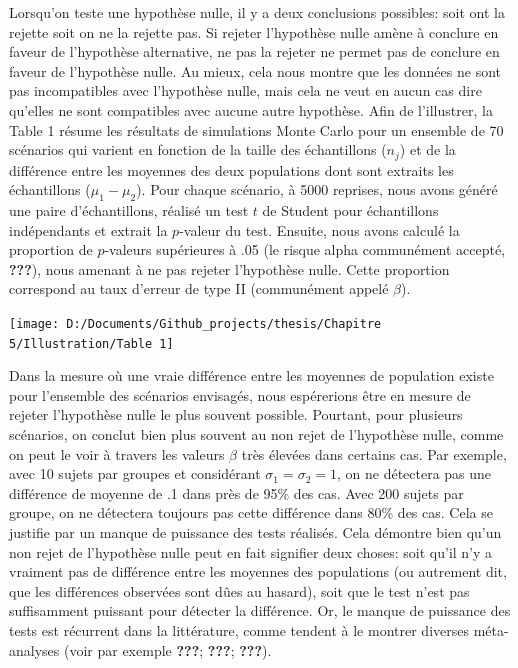 \documentclass[
  english,
  man]{apa6}
\begin{document}
Lorsqu'on teste une hypothèse nulle, il y a deux conclusions possibles: soit ont la rejette soit on ne la rejette pas. Si rejeter l'hypothèse nulle amène à conclure en faveur de l'hypothèse alternative, ne pas la rejeter ne permet pas de conclure en faveur de l'hypothèse nulle. Au mieux, cela nous montre que les données ne sont pas incompatibles avec l'hypothèse nulle, mais cela ne veut en aucun cas dire qu'elles ne sont compatibles avec aucune autre hypothèse. Afin de l'illustrer, la Table 1 résume les résultats de simulations Monte Carlo pour un ensemble de 70 scénarios qui varient en fonction de la taille des échantillons (\(n_j\)) et de la différence entre les moyennes des deux populations dont sont extraits les échantillons (\(\mu_1-\mu_2\)). Pour chaque scénario, à 5000 reprises, nous avons généré une paire d'échantillons, réalisé un test \(t\) de Student pour échantillons indépendants et extrait la \(p\)-valeur du test. Ensuite, nous avons calculé la proportion de \(p\)-valeurs supérieures à .05 (le risque alpha communément accepté, {\textbf{???}}), nous amenant à ne pas rejeter l'hypothèse nulle. Cette proportion correspond au taux d'erreur de type II (communément appelé \(\beta\)).

\begin{center}\texttt{[image: D:/Documents/Github\_projects/thesis/Chapitre 5/Illustration/Table 1]} \end{center}

Dans la mesure où une vraie différence entre les moyennes de population existe pour l'ensemble des scénarios envisagés, nous espérerions être en mesure de rejeter l'hypothèse nulle le plus souvent possible. Pourtant, pour plusieurs scénarios, on conclut bien plus souvent au non rejet de l'hypothèse nulle, comme on peut le voir à travers les valeurs \(\beta\) très élevées dans certains cas. Par exemple, avec 10 sujets par groupes et considérant \(\sigma_1=\sigma_2=1\), on ne détectera pas une différence de moyenne de .1 dans près de 95\% des cas. Avec 200 sujets par groupe, on ne détectera toujours pas cette différence dans 80\% des cas. Cela se justifie par un manque de puissance des tests réalisés. Cela démontre bien qu'un non rejet de l'hypothèse nulle peut en fait signifier deux choses: soit qu'il n'y a vraiment pas de différence entre les moyennes des populations (ou autrement dit, que les différences observées sont dûes au hasard), soit que le test n'est pas suffisamment puissant pour détecter la différence. Or, le manque de puissance des tests est récurrent dans la littérature, comme tendent à le montrer diverses méta-analyses (voir par exemple {\textbf{???}}; {\textbf{???}}; {\textbf{???}}).
\end{document}
